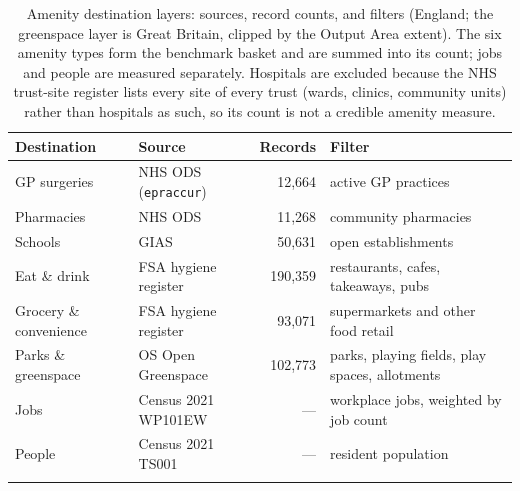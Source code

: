 \documentclass[pdflatex,sn-nature]{sn-jnl}
\begin{document}
\begin{table}[p]
\caption{Amenity destination layers: sources, record counts, and filters (England; the greenspace layer is Great Britain, clipped by the Output Area extent). The six amenity types form the benchmark basket and are summed into its count; jobs and people are measured separately. Hospitals are excluded because the NHS trust-site register lists every site of every trust (wards, clinics, community units) rather than hospitals as such, so its count is not a credible amenity measure.}
\label{edtab:sources}
\begin{tabular}{llrp{}}
\toprule
Destination & Source & Records & Filter \\
\midrule
GP surgeries & NHS ODS (\texttt{epraccur}) & 12,664 & active GP practices \\
Pharmacies & NHS ODS & 11,268 & community pharmacies \\
Schools & GIAS & 50,631 & open establishments \\
Eat \& drink & FSA hygiene register & 190,359 & restaurants, cafes, takeaways, pubs \\
Grocery \& convenience & FSA hygiene register & 93,071 & supermarkets and other food retail \\
Parks \& greenspace & OS Open Greenspace & 102,773 & parks, playing fields, play spaces, allotments \\
Jobs & Census 2021 WP101EW & --- & workplace jobs, weighted by job count \\
People & Census 2021 TS001 & --- & resident population \\
\botrule
\end{tabular}
\end{table}

\begin{table}[p]
\caption{The decarbonisation-scenario ladder with 95\% confidence intervals (compositional detached:flat total energy per dwelling, clustered on local-authority districts). The equal-household-size column re-estimates each ratio with household size entered as a control whose effect is estimated from the data (Methods). Every scenario is fitted on the same \nepisampleN{} areas as the headline gaps. The Balanced Pathway estimate is insensitive to the assumed heat-pump seasonal coefficient of performance (\nepicopLow$\times$ at 2.4, \nepicopMid$\times$ at 2.8, \nepicopHigh$\times$ at 3.2).}
\label{edtab:scenarios}

\end{table}
\end{document}
